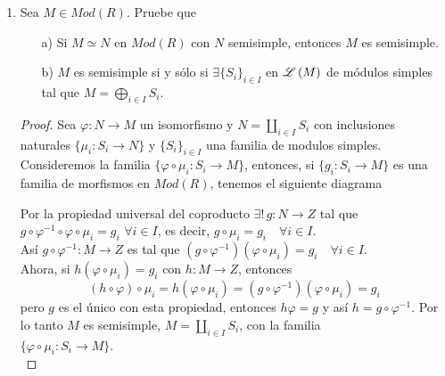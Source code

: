 \documentclass{article}
\begin{document}
\begin{enumerate}[label=\textbf{Ej \arabic*.}]
\begin{proof}
			, se tiene que $M \coprod N \in f.l.\lrprth{R}$, ya que $M,N$ tienen longitud finita. Más aún, dada una serie de composición $\mathfrak{F}$ para $M \coprod N$, el \textbf{Lema 2.1.1.b)} garantiza que 
			\begin{align*}
				l_{\mathfrak{F}}\lrprth{M \coprod N}=l_{f^{-1}\lrprth{\mathfrak{F}}}\lrprth{M}+l_{g\lrprth{\mathfrak{F}}}\lrprth{N}
			\end{align*}
			$\therefore l\lrprth{M \coprod N}=l\lrprth{M}+l\lrprth{N}$.
		\end{proof}
		
		
		\item Sea $M\in Mod(R)$. Pruebe que 
		\begin{itemize}
			\item[a)] Si $M\simeq N$ en $Mod(R)$ con $N$ semisimple, entonces $M$ es semisimple.
			
			\item[b)] $M$ es semisimple si y sólo si $\exists\{S_i\}_{i\in I}$ en $\mathscr{L}\left(M\right)$ de módulos simples tal que $M=\displaystyle\bigoplus_{i\in I}S_i$.
			
		\end{itemize}
		\begin{proof}
			 Sea $\varphi \colon N\longrightarrow M$ un isomorfismo y $N=\displaystyle\coprod_{i\in I}S_i$ con inclusiones naturales 
			$\{\mu_i\colon S_i\longrightarrow N\}$ y $\{S_i\}_{i\in I}$ una familia de modulos simples.\\
			Consideremos la familia $\{\varphi\circ \mu_i\colon S_i\longrightarrow M\}$, entonces, si $\{g_i\colon S_i\longrightarrow M\}$ es una 
			familia de morfismos en $Mod(R)$, tenemos el siguiente diagrama
			
			Por la propiedad universal del coproducto $\exists !\,g\colon N\longrightarrow Z$ tal que \\
			$g\circ \varphi^{-1}\circ\varphi\circ \mu_i=g_i \,\, \forall i\in I$, es decir, $g\circ\mu_i=g_i\quad \forall i\in I$.\\
			Así $g\circ \varphi^{-1}\colon M\longrightarrow Z$ es tal que $(g\circ \varphi^{-1})(\varphi\circ \mu_i)=g_i\quad \forall i\in I$.\\
			Ahora, si $h(\varphi\circ \mu_i)=g_i$ con $h\colon M\longrightarrow Z$, entonces 
			\[(h\circ\varphi)\circ \mu_i=h(\varphi\circ \mu_i)=(g\circ \varphi^{-1})(\varphi\circ \mu_i)=g_i\]
			pero $g$ es el único con esta propiedad, entonces $h\varphi=g$ y así $h=g\circ \varphi^{-1}$. Por lo tanto $M$ es semisimple,
			$M=\displaystyle\coprod_{i\in I}S_i$, con la familia\\ $\{\varphi\circ\mu_i\colon S_i\longrightarrow M\}$.\\
			

\end{proof}
\end{enumerate}
\end{document}
